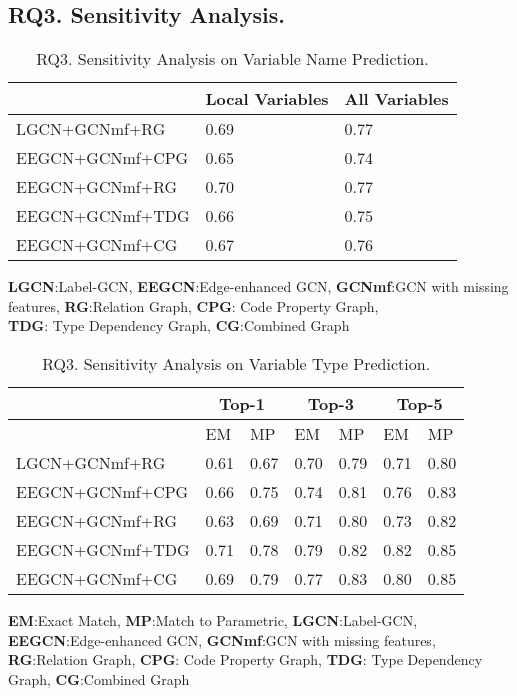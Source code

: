 \subsection{{\bf RQ3. Sensitivity Analysis.}}
\label{empirical-rq3}

\begin{table}[t]
	\caption{RQ3. Sensitivity Analysis on Variable Name Prediction.}
	\begin{center}
		\small
		\renewcommand{\arraystretch}{1} 
		\begin{tabular}{p{2.5cm}<{\centering}|p{2cm}<{\centering}|p{2cm}<{\centering}}
			\hline
			                    & Local Variables & All Variables\\
			\hline
			LGCN+GCNmf+RG       & 0.69            & 0.77    \\
			EEGCN+GCNmf+CPG     & 0.65            & 0.74    \\
			EEGCN+GCNmf+RG      & 0.70            & 0.77    \\
			EEGCN+GCNmf+TDG     & 0.66            & 0.75    \\
			EEGCN+GCNmf+CG      & 0.67            & 0.76    \\
			\hline
		\end{tabular}
		\label{RQ3-result-1}
		{\bf LGCN}:Label-GCN, {\bf EEGCN}:Edge-enhanced GCN, {\bf GCNmf}:GCN with missing features, {\bf RG}:Relation Graph, {\bf CPG}: Code Property Graph, \\{\bf TDG}: Type Dependency Graph, {\bf CG}:Combined Graph
	\end{center}
\end{table}

\begin{table}[t]
	\caption{RQ3. Sensitivity Analysis on Variable Type Prediction.}
	\begin{center}
		\small
		\renewcommand{\arraystretch}{1} \begin{tabular}{p{2.5cm}<{\centering}|p{0.5cm}<{\centering}|p{0.5cm}<{\centering}|p{0.5cm}<{\centering}|p{0.5cm}<{\centering}|p{0.5cm}<{\centering}|p{0.5cm}<{\centering}}
			
			\hline
			& \multicolumn{2}{c}{Top-1}         & \multicolumn{2}{c}{Top-3}         & \multicolumn{2}{c}{Top-5} \\
			\hline
			& EM & MP & EM & MP & EM & MP  \\ 
			\hline
			LGCN+GCNmf+RG   & 0.61 & 0.67 & 0.70 & 0.79 & 0.71 & 0.80 \\
			EEGCN+GCNmf+CPG & 0.66 & 0.75 & 0.74 & 0.81 & 0.76 & 0.83 \\
			EEGCN+GCNmf+RG  & 0.63 & 0.69 & 0.71 & 0.80 & 0.73 & 0.82 \\
			EEGCN+GCNmf+TDG & 0.71 & 0.78 & 0.79 & 0.82 & 0.82 & 0.85 \\
			EEGCN+GCNmf+CG  & 0.69 & 0.79 & 0.77 & 0.83 & 0.80 & 0.85 \\
			\hline
		\end{tabular}
		\label{RQ3-result-2}
		{\bf EM}:Exact Match, {\bf MP}:Match to Parametric, {\bf LGCN}:Label-GCN, {\bf EEGCN}:Edge-enhanced GCN, {\bf GCNmf}:GCN with missing features, {\bf RG}:Relation Graph, {\bf CPG}: Code Property Graph, {\bf TDG}: Type Dependency Graph, {\bf CG}:Combined Graph
	\end{center}
\end{table}

